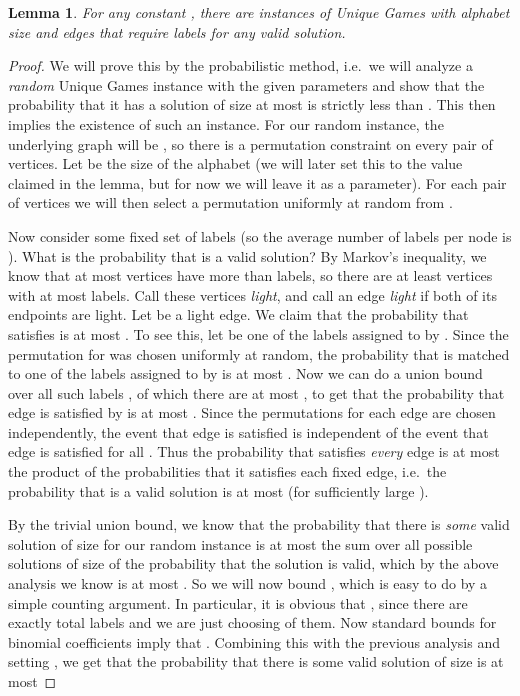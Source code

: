 \documentclass[11pt,letterpaper]{article}
\newtheorem{lemma}[theorem]{Lemma}
\theoremstyle{definition}
\begin{document}
\begin{lemma} \label{lem:Unique} For any constant ,
  there are instances of Unique Games with alphabet size
   and  edges that
  require  labels for any valid solution.
\end{lemma}
\begin{proof}
  We will prove this by the probabilistic method, i.e.\ we will
  analyze a \emph{random} Unique Games instance with the given
  parameters and show that the probability that it has a solution of
  size at most  is strictly less than .  This then implies
  the existence of such an instance.  For our random instance, the
  underlying graph will be , so there is a permutation constraint
  on every pair of vertices.  Let  be the size of the
  alphabet (we will later set this to the value claimed in the lemma, but for now we will leave it
  as a parameter).  For each pair of vertices we will then select a
  permutation uniformly at random from .

  Now consider some fixed set  of  labels (so the average
  number of labels per node is ).  What is the probability
  that  is a valid solution?  By Markov's inequality, we know that
  at most  vertices have more than  labels, so there are
  at least  vertices with at most  labels.  Call these
  vertices \emph{light}, and call an edge \emph{light} if both of its
  endpoints are light.  Let  be a light edge.  We claim that
  the probability that  satisfies  is at most
  .  To see this, let  be one of
  the labels assigned to  by .  Since the permutation for
   was chosen uniformly at random, the probability that
   is matched to one of the labels assigned to  by  is at
  most .  Now we can do a union bound over all such
  labels , of which there are at most , to get that the
  probability that edge  is satisfied by  is at most
  .  Since the permutations for each edge are
  chosen independently, the event that edge  is satisfied is
  independent of the event that edge  is satisfied for all .  Thus the probability that  satisfies \emph{every} edge
  is at most the product of the probabilities that it satisfies each
  fixed edge, i.e.\ the probability that  is a valid solution is at
  most  (for sufficiently large ).

  By the trivial union bound, we know that the probability that there
  is \emph{some} valid solution of size  for our random
  instance is at most the sum over all possible solutions of size
   of the probability that the solution is valid, which by
  the above analysis we know is at most .  So we
  will now bound , which is easy to do
  by a simple counting argument.  In particular, it is obvious that , since there are exactly  total labels
  and we are just choosing  of them.  Now standard bounds
  for binomial coefficients imply that .  Combining this with the previous analysis and setting
  , we get that the probability that there is
  some valid solution of size  is at most


\end{proof}
\end{document}
